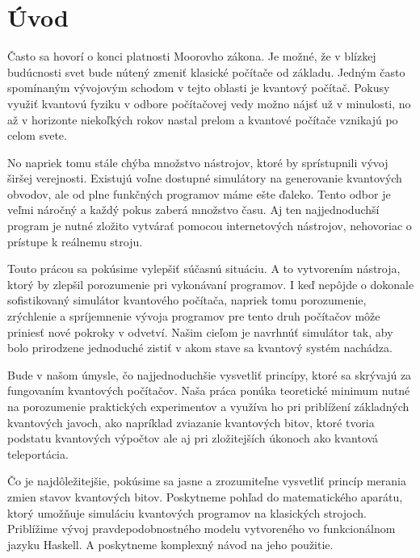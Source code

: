 

\chapter*{Úvod}

Často sa hovorí o konci platnosti Moorovho zákona. Je možné, že v blízkej
budúcnosti svet bude nútený zmeniť klasické počítače od základu. Jedným 
často spomínaným vývojovým schodom v tejto oblasti je kvantový počítač.
Pokusy využiť kvantovú fyziku v odbore počítačovej vedy možno nájsť už v
minulosti, no až v horizonte niekoľkých rokov nastal prelom a kvantové
počítače vznikajú po celom svete.

No napriek tomu stále chýba množstvo nástrojov, ktoré by sprístupnili vývoj
širšej verejnosti. Existujú voľne dostupné simulátory na generovanie kvantových
obvodov, ale od plne funkčných programov máme ešte ďaleko. Tento odbor je 
veľmi náročný a každý pokus zaberá množstvo času. Aj ten najjednoduchší program
je nutné zložito vytvárať pomocou internetových nástrojov, nehovoriac o 
prístupe k reálnemu stroju.

Touto prácou sa pokúsime vylepšiť súčasnú situáciu. A to vytvorením nástroja,
ktorý by zlepšil porozumenie pri vykonávaní programov. I keď nepôjde o 
dokonale sofistikovaný simulátor kvantového počítača, napriek tomu porozumenie,
zrýchlenie a spríjemnenie vývoja programov pre tento druh počítačov môže 
priniesť nové pokroky v odvetví. Našim cieľom je navrhnúť simulátor tak, aby 
bolo prirodzene jednoduché zistiť v akom stave sa kvantový systém nachádza.

Bude v našom úmysle, čo najjednoduchšie vysvetliť princípy, ktoré sa skrývajú
za fungovaním kvantových počítačov. Naša práca ponúka teoretické minimum
nutné na porozumenie praktických experimentov a využíva ho pri priblížení
základných kvantových javoch, ako napríklad zviazanie kvantových bitov, ktoré 
tvoria podstatu kvantových výpočtov ale aj pri zložitejších úkonoch ako 
kvantová teleportácia.


Čo je najdôležitejšie, pokúsime sa jasne a zrozumiteľne vysvetliť princíp
merania zmien stavov kvantových bitov. Poskytneme pohľad do matematického
aparátu, ktorý umožňuje simuláciu kvantových programov na klasických strojoch.
Priblížime vývoj pravdepodobnostného modelu vytvoreného vo funkcionálnom jazyku
Haskell. A poskytneme komplexný návod na jeho použitie.
